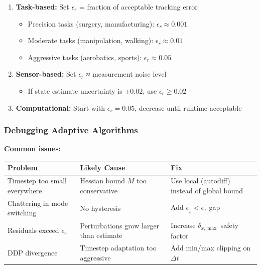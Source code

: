 \documentclass[
  letterpaper,
  DIV=11,
  numbers=noendperiod]{scrartcl}
\providecommand{\tightlist}{%
  \setlength{\itemsep}{0pt}\setlength{\parskip}{0pt}}\usepackage{longtable,booktabs,array}
\begin{document}
\begin{enumerate}
\def\labelenumi{\arabic{enumi}.}
\tightlist
\item
  \textbf{Task-based:} Set \(\epsilon_r\) = fraction of acceptable
  tracking error

  \begin{itemize}
  \tightlist
  \item
    Precision tasks (surgery, manufacturing):
    \(\epsilon_r \approx 0.001\)
  \item
    Moderate tasks (manipulation, walking): \(\epsilon_r \approx 0.01\)
  \item
    Aggressive tasks (aerobatics, sports): \(\epsilon_r \approx 0.05\)
  \end{itemize}
\item
  \textbf{Sensor-based:} Set \(\epsilon_r\) ≈ measurement noise level

  \begin{itemize}
  \tightlist
  \item
    If state estimate uncertainty is \(\pm 0.02\), use
    \(\epsilon_r \geq 0.02\)
  \end{itemize}
\item
  \textbf{Computational:} Start with \(\epsilon_r = 0.05\), decrease
  until runtime acceptable
\end{enumerate}

\subsubsection{Debugging Adaptive
Algorithms}\label{debugging-adaptive-algorithms}

\textbf{Common issues:}

\begin{longtable}[]{@{}
  >{\raggedright\arraybackslash}p{}
  >{\raggedright\arraybackslash}p{}
  >{\raggedright\arraybackslash}p{}@{}}
\toprule\noalign{}
\begin{minipage}[b]{\linewidth}\raggedright
Problem
\end{minipage} & \begin{minipage}[b]{\linewidth}\raggedright
Likely Cause
\end{minipage} & \begin{minipage}[b]{\linewidth}\raggedright
Fix
\end{minipage} \\
\midrule\noalign{}
\endhead
\bottomrule\noalign{}
\endlastfoot
Timestep too small everywhere & Hessian bound \(M\) too conservative &
Use local (autodiff) instead of global bound \\
Chattering in mode switching & No hysteresis & Add
\(\epsilon_{\downarrow} < \epsilon_{\uparrow}\) gap \\
Residuals exceed \(\epsilon_r\) & Perturbations grow larger than
estimate & Increase \(\delta_{x,\max}\) safety factor \\
DDP divergence & Timestep adaptation too aggressive & Add min/max
clipping on \(\Delta t\) \\
\end{longtable}
\end{document}
